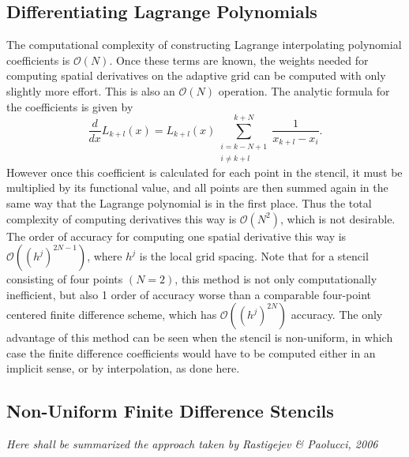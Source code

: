 \documentclass[11pt]{article}
\begin{document}
\subsection{Differentiating Lagrange Polynomials} 
The computational complexity of constructing Lagrange interpolating polynomial coefficients is $\mathcal{O}(N)$. 
Once these terms are known, the weights needed for computing spatial derivatives on the adaptive grid can be computed with only slightly more effort. This is also an $\mathcal{O}(N)$ operation. 
The analytic formula for the coefficients is given by
\begin{equation}
    \frac{d}{dx} L_{k+l}(x) = L_{k+l}(x) \sum_{ \substack{ i=k-N+1 \\ i\neq k+l } }^{k+N} \frac{1}{x_{k+l}-x_i}.
\end{equation}
However once this coefficient is calculated for each point in the stencil, it must be multiplied by its functional value, 
and all points are then summed again in the same way that the Lagrange polynomial is in the first place. 
Thus the total complexity of computing derivatives this way is $\mathcal{O}(N^2)$, which is not desirable. The order of 
accuracy for computing one spatial derivative this way is $\mathcal{O}((h^j)^{2N-1})$, where $h^j$ is the local grid spacing. 
Note that for a stencil consisting of four points $(N=2)$, this method is not only computationally inefficient, but also 1 order 
of accuracy worse than a comparable four-point centered finite difference scheme, which has $\mathcal{O}((h^j)^{2N})$
accuracy. The only advantage of this method can be seen when the stencil is non-uniform, in which case the finite difference 
coefficients would have to be computed either in an implicit sense, or by interpolation, as done here.
\subsection{Non-Uniform Finite Difference Stencils}
\textit{Here shall be summarized the approach taken by Rastigejev \& Paolucci, 2006 }
\end{document}
